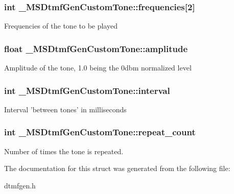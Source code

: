 \subsubsection[{frequencies}]{\setlength{\rightskip}{0pt plus 5cm}int {\bf \_\-MSDtmfGenCustomTone::frequencies}[2]}\label{struct__MSDtmfGenCustomTone_a99a919823a880e4dc0a93658552544dc}
Frequencies of the tone to be played 
\subsubsection[{amplitude}]{\setlength{\rightskip}{0pt plus 5cm}float {\bf \_\-MSDtmfGenCustomTone::amplitude}}\label{struct__MSDtmfGenCustomTone_a90d0f5b8d13fd5587e77806ecdfd7455}
Amplitude of the tone, 1.0 being the 0dbm normalized level 
\subsubsection[{interval}]{\setlength{\rightskip}{0pt plus 5cm}int {\bf \_\-MSDtmfGenCustomTone::interval}}\label{struct__MSDtmfGenCustomTone_a604e9376bdd62d37d56c50c8343b0343}
Interval 'between tones' in milliseconds 
\subsubsection[{repeat\_\-count}]{\setlength{\rightskip}{0pt plus 5cm}int {\bf \_\-MSDtmfGenCustomTone::repeat\_\-count}}\label{struct__MSDtmfGenCustomTone_a7b337483f7911a1737440def4b85292b}
Number of times the tone is repeated. 

The documentation for this struct was generated from the following file:\begin{DoxyCompactItemize}
\item 
dtmfgen.h\end{DoxyCompactItemize}
